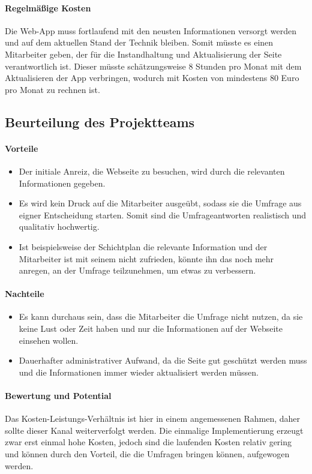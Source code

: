 \paragraph{Regelmäßige Kosten}
Die Web-App muss fortlaufend mit den neusten Informationen versorgt werden und auf dem aktuellen Stand der Technik bleiben. Somit müsste es einen Mitarbeiter geben, der für die Instandhaltung und Aktualisierung der Seite verantwortlich ist. Dieser müsste schätzungsweise 8 Stunden pro Monat mit dem Aktualisieren der App verbringen, wodurch mit Kosten von mindestens 80 Euro pro Monat zu rechnen ist.

\subsection{Beurteilung des Projektteams}

\paragraph{Vorteile}
\begin{itemize} 
\item Der initiale Anreiz, die Webseite zu besuchen, wird durch die relevanten Informationen gegeben.
\item Es wird kein Druck auf die Mitarbeiter ausgeübt, sodass sie die Umfrage aus eigner Entscheidung starten. Somit sind die Umfrageantworten realistisch und qualitativ hochwertig.
\item Ist beispielsweise der Schichtplan die relevante Information und der Mitarbeiter ist mit seinem nicht zufrieden, könnte ihn das noch mehr anregen, an der Umfrage teilzunehmen, um etwas zu verbessern.
\end{itemize}


\paragraph{Nachteile}
\begin{itemize}
\item Es kann durchaus sein, dass die Mitarbeiter die Umfrage nicht nutzen, da sie keine Lust oder Zeit haben und nur die Informationen auf der Webseite einsehen wollen.
\item Dauerhafter administrativer Aufwand, da die Seite gut geschützt werden muss und die Informationen immer wieder aktualisiert werden müssen.
\end{itemize}


\paragraph{Bewertung und Potential}%
Das Kosten-Leistungs-Verhältnis ist hier in einem angemessenen Rahmen, daher sollte dieser Kanal weiterverfolgt werden. Die einmalige Implementierung erzeugt zwar erst einmal hohe Kosten, jedoch sind die laufenden Kosten relativ gering und können durch den Vorteil, die die Umfragen bringen können, aufgewogen werden.

